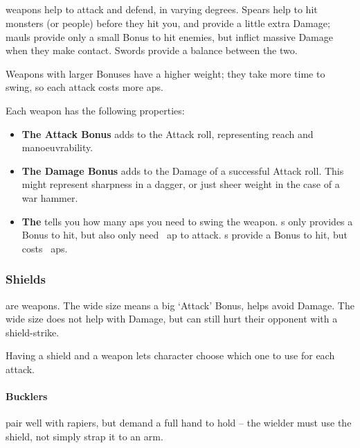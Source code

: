 \begin{multicols}{2}

\subsection{}

\noindent
\Glspl{weapon} help to attack and defend, in varying degrees.
Spears help to hit \glspl{monster} (or people) before they hit you, and provide a little extra Damage; mauls provide only a small Bonus to hit enemies, but inflict massive Damage when they make contact.
Swords provide a balance between the two.

Weapons with larger Bonuses have a higher \gls{weight}; they take more time to swing, so each attack costs more \glspl{ap}.

Each \gls{weapon} has the following properties:

\begin{itemize}
  \item
  \textbf{The Attack Bonus}
  adds to the Attack roll, representing reach and manoeuvrability.
  \item
  \textbf{The Damage Bonus}
  adds to the Damage of a successful Attack roll.
  This might represent sharpness in a dagger, or just sheer weight in the case of a war hammer.
  \item
  \textbf{The }
  tells you how many \glspl{ap} you need to swing the weapon.
  \shortsword\weaponName s
  only provides a  Bonus to hit, but also only need ~\gls{ap} to attack.
  \greatsword\weaponName s
  provide a  Bonus to hit, but costs ~\glspl{ap}.
\end{itemize}

\weaponsChart
\label{weaponschart}

\subsubsection{Shields}
\label{shields}
are weapons.
The wide size means a big `Attack' Bonus, helps avoid Damage.
The wide size does not help with Damage, but  can still hurt their opponent with a shield-strike.

Having a shield and a weapon lets character choose which one to use for each attack.

\paragraph{Bucklers}
pair well with rapiers, but demand a full hand to hold -- the wielder must use the shield, not simply strap it to an arm.


\end{multicols}
